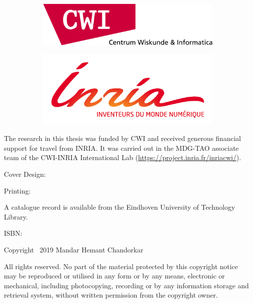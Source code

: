 
\begin{figure}
    \centering
    \begin{subfigure}[b]{0.6\textwidth}
      \centering
      \includegraphics[width=\textwidth]{figures/cwi-logo}
    \end{subfigure}
    \hfill
    \begin{subfigure}[b]{0.6\textwidth}
      \centering
      \includegraphics[width=\textwidth]{figures/inria-logo}
    \end{subfigure}
\end{figure}

\vspace{\fill}

{\noindent
The research in this thesis was funded by CWI and received generous financial support for travel 
from INRIA. It was carried out in the MDG-TAO associate team of the CWI-INRIA International Lab 
(\url{https://project.inria.fr/inriacwi/}).
}

\vspace{\fill}

{
\noindent
Cover Design: \coverdesign 

\noindent
Printing: \printingcompany

\noindent
A catalogue record is available from the Eindhoven University of Technology Library. 

\noindent
ISBN: \isbncode
}

\vspace{\baselineskip}

{\small \noindent
Copyright \textcopyright \ 2019 Mandar Hemant Chandorkar

\noindent
All rights reserved. No part of the material protected by this copyright notice may be reproduced 
or utilised in any form or by any means, electronic or mechanical, including photocopying, 
recording or by any information storage and retrieval system, without written permission from the 
copyright owner.
}
